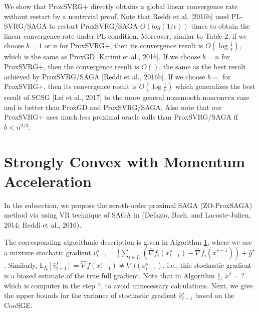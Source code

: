 \documentclass{article}
\newcommand*{\E}{\mathbb{E}}
\theoremstyle{definition}
\theoremstyle{remark}
\begin{document}
{\color{Violet}
We show that ProxSVRG+ directly obtains a global linear convergence rate without restart by a nontrivial proof. Note that Reddi et al. [2016b] used PL-SVRG/SAGA to restart ProxSVRG/SAGA $O(log(1/\epsilon))$ times to obtain
the linear convergence rate under PL condition.
Moreover, similar to Table 2, if we choose $b = 1$ or $n$ for ProxSVRG+, then its convergence result is $O(\log \frac{1}{\epsilon})$,
which is the same as ProxGD [Karimi et al., 2016]. If we choose $b = n$ for ProxSVRG+, then the convergence result is $O()$, the same as the best result achieved by ProxSVRG/SAGA [Reddi et al., 2016b]. If we
choose $b = $ for ProxSVRG+, then its convergence result is $O(\log\frac{1}{\epsilon})$
which generalizes the best result of SCSG [Lei et al., 2017] to the more general nonsmooth nonconvex case and is better than ProxGD and ProxSVRG/SAGA. Also note that our ProxSVRG+ uses much less proximal oracle calls than ProxSVRG/SAGA if $b < n ^{2/3}$.

}
\section{Strongly Convex with Momentum Acceleration}
{\color{Green}

In the subsection, we propose the zeroth-order proximal SAGA (ZO-ProxSAGA) method via using VR technique of SAGA in (Defazio, Bach, and Lacoste-Julien, 2014; Reddi et al., 2016).

The corresponding algorithmic description is given in Algorithm \ref{}, where we use a mixture
stochatic gradient ${\hat{v}}_{t-1}^s = \frac{1}{b} \sum_{i\in I_b}\left(\hat{\nabla} f_{i}(x_{t-1}^s)-\hat{\nabla} f_{i}(\tilde{x}^{s-1})\right)+\hat{g}^s$. Similarly, $\E_{I_b}[\hat{v}_{t-1}^s] = \hat{\nabla} f(x_{t-1}^s) \neq {\nabla} f(x_{t-1}^s)$, i.e., this stochastic gradient is a biased
estimate of the true full gradient. Note that in Algorithm \ref{}, $\widetilde{x}^s = ?$ which is computer in the step ?, to avoid unnecessary calculations. Next, we give the upper bounds for the variance of stochastic gradient $\hat{v}_{t-1}^s$ based on the CooSGE.
}
\end{document}
